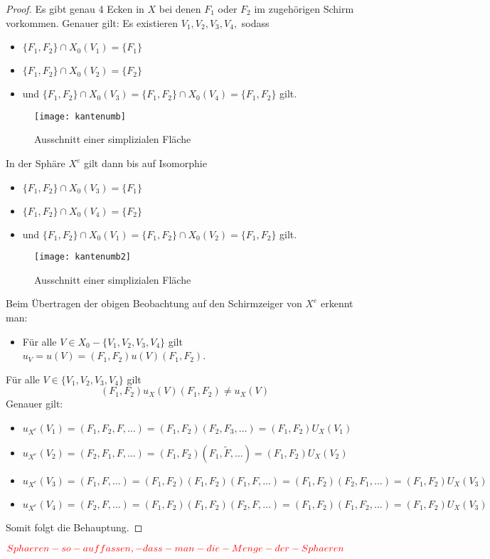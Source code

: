 \documentclass[12pt,titlepage,twoside,cleardoublepage]{article}
\theoremstyle{nummermitklammern}
\numberwithin{equation}{section}
\begin{document}
\begin{proof}
Es gibt genau 4 Ecken in $X$ bei denen $F_1$ oder $F_2$ im zugehörigen Schirm vorkommen. Genauer gilt: Es existieren $V_1,V_2,V_3,V_4,$ sodass 
\begin{itemize}
\item $\{F_1,F_2\} \cap X_0(V_1)=\{F_1\}$ 
\item $\{F_1,F_2\} \cap X_0(V_2)=\{F_2\}$
\item und $\{F_1,F_2\} \cap X_0(V_3)=\{F_1,F_2\} \cap X_0(V_4)=\{F_1,F_2\}$ gilt.
\end{itemize}
\begin{figure}[H]
\begin{center}
\texttt{[image: kantenumb]}
\end{center}
\caption{Ausschnitt einer simplizialen Fläche}
\end{figure}
In der Sphäre $X^e$ gilt dann bis auf Isomorphie  
\begin{itemize}
\item $\{F_1,F_2\} \cap X_0(V_3)=\{F_1\}$ 
\item $\{F_1,F_2\} \cap X_0(V_4)=\{F_2\}$
\item und $\{F_1,F_2\} \cap X_0(V_1)=\{F_1,F_2\} \cap X_0(V_2)=\{F_1,F_2\}$ gilt.
\end{itemize}
\begin{figure}[H]
\begin{center}
\texttt{[image: kantenumb2]}
\end{center}
\caption{Ausschnitt einer simplizialen Fläche}
\end{figure}
Beim Übertragen der obigen Beobachtung auf den Schirmzeiger von $X^e$ erkennt man:
\begin{itemize}
\item Für alle $V\in X_0-\{V_1,V_2,V_3,V_4\}$ gilt $u_V=u(V)=(F_1,F_2)u(V) (F_1,F_2)$.
\end{itemize}
Für alle $V\in \{V_1,V_2,V_3,V_4\}$ gilt 
\[
(F_1,F_2)u_X(V)(F_1,F_2) \neq u_X(V)
\]
Genauer gilt:
\begin{itemize} 
\item $u_{X^e}(V_1)=(F_1,F_2,F,\ldots)=(F_1,F_2)(F_2,F_3,\ldots)=(F_1,F_2)U_X(V_1)$
\item $u_{X^e}(V_2)=(F_2,F_1,F,\ldots)=(F_1,F_2)(F_1,\tilde{F},\ldots)=(F_1,F_2)U_X(V_2)$
\item $u_{X^e}(V_3)=(F_1,F,\ldots)=(F_1,F_2)(F_1,F_2)(F_1,F,\ldots)=(F_1,F_2)(F_2,F_1,\ldots)=(F_1,F_2)U_X(V_3)$
\item $u_{X^e}(V_4)=(F_2,F,\ldots)=(F_1,F_2)(F_1,F_2)(F_2,F,\ldots)=(F_1,F_2)(F_1,F_2,\ldots)=(F_1,F_2)U_X(V_3)$

\end{itemize}
Somit folgt die Behauptung.
\end{proof}
$\textcolor{red}{Sphaeren-so-auffassen,-dass-man-die-Menge-der-Sphaeren}$
\end{document}
